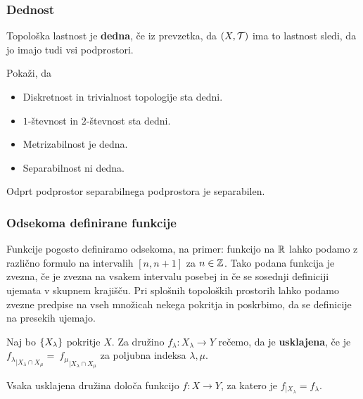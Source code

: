 \subsubsection{Dednost}
\begin{definicija}
    Topološka lastnost je \textbf{dedna}, če iz prevzetka, da $(X, \mathcal{T})$ ima to lastnost sledi, da jo imajo tudi vsi podprostori.
\end{definicija}

\begin{primer}
    Pokaži, da
    \begin{itemize}
        \item Diskretnost in trivialnost topologije sta dedni.
        \item $1$-števnost in $2$-števnost sta dedni.
        \item Metrizabilnost je dedna.
        \item Separabilnost ni dedna.
    \end{itemize}
\end{primer}

\begin{opomba}
    Odprt podprostor separabilnega podprostora je separabilen.
\end{opomba}

\subsubsection{Odsekoma definirane funkcije}
Funkcije pogosto definiramo odsekoma, na primer: funkcijo na $\mathbb{R}$ lahko  podamo z različno formulo na intervalih $[n, n+1]$ za $n \in \mathbb{Z}$. Tako podana funkcija je zvezna, če je zvezna na vsakem intervalu posebej in če se sosednji definiciji ujemata v skupnem krajišču. Pri splošnih topoloških prostorih lahko podamo zvezne predpise na vseh množicah nekega pokritja in poskrbimo, da se definicije na presekih ujemajo.

\begin{definicija}
    Naj bo $\{X_\lambda\}$ pokritje $X$. Za družino $f_\lambda: X_\lambda \to Y$ rečemo, da je \textbf{usklajena}, če je ${f_\lambda}_{|X_\lambda \cap X_\mu} =~{f_\mu}_{|X_\lambda \cap X_\mu}$ za poljubna indeksa $\lambda, \mu$.
\end{definicija}

\begin{trditev}
    Vsaka usklajena družina določa funkcijo $f: X \to Y$, za katero je $f_{|X_\lambda} = f_\lambda$.
\end{trditev}

